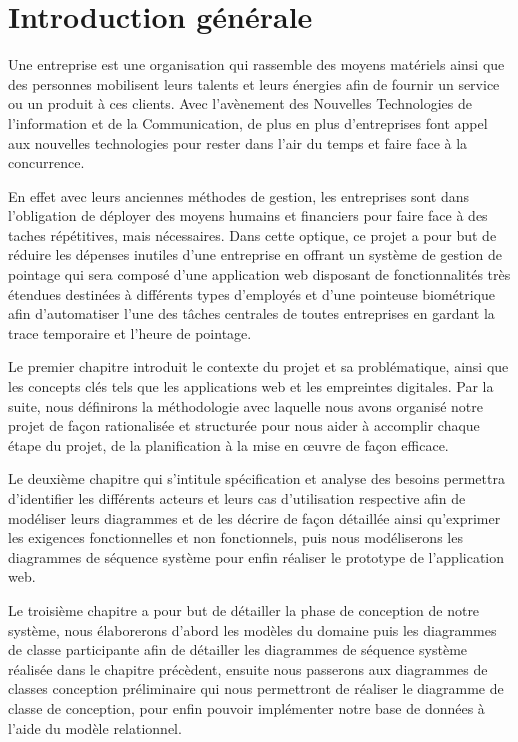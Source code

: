 \chapter*{Introduction générale}
\renewcommand{\headrulewidth}{1pt}
\onehalfspacing
\thispagestyle{empty}
    
 Une entreprise est une organisation qui rassemble des moyens matériels ainsi que des personnes mobilisent leurs talents et leurs énergies afin de fournir un service ou un produit à ces clients. Avec l’avènement des Nouvelles Technologies de l’information et de la Communication, de plus en plus d’entreprises font appel aux nouvelles technologies pour rester dans l’air du temps et faire face à la concurrence.

En effet avec leurs anciennes méthodes de gestion, les entreprises sont dans l’obligation de déployer des moyens humains et financiers pour faire face à des taches répétitives, mais nécessaires. Dans cette optique, ce projet a pour but de réduire les dépenses inutiles d’une entreprise en offrant un système de gestion de pointage qui sera composé d’une application web disposant de fonctionnalités très étendues destinées à différents types d’employés et d’une pointeuse biométrique afin d’automatiser l’une des tâches centrales de toutes entreprises en gardant la trace temporaire et l’heure de pointage.

Le premier chapitre introduit le contexte du projet et sa problématique, ainsi que les concepts clés tels que les applications web et les empreintes digitales. Par la suite, nous définirons la méthodologie avec laquelle nous avons organisé notre projet de façon rationalisée et structurée pour nous aider à accomplir chaque étape du projet, de la planification à la mise en œuvre de façon efficace.

Le deuxième chapitre qui s’intitule spécification et analyse des besoins permettra d’identifier les différents acteurs et leurs cas d’utilisation respective afin de modéliser leurs diagrammes et de les décrire de façon détaillée ainsi qu’exprimer les exigences fonctionnelles et non fonctionnels, puis nous modéliserons les diagrammes de séquence système pour enfin réaliser le prototype de l’application web.

Le troisième chapitre a pour but de détailler la phase de conception de notre système, nous élaborerons d’abord les modèles du domaine puis les diagrammes de classe participante afin de détailler les diagrammes de séquence système réalisée dans le chapitre précèdent, ensuite nous passerons aux diagrammes de classes conception préliminaire qui nous permettront de réaliser le diagramme de classe de conception, pour enfin pouvoir implémenter notre base de données à l’aide du modèle relationnel. 

